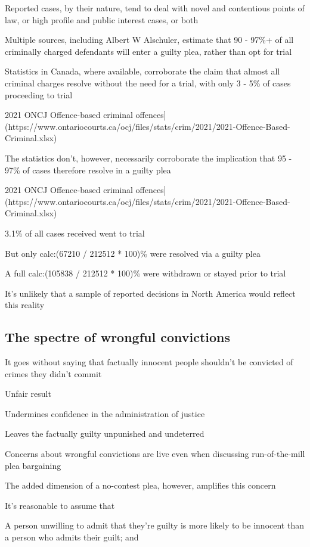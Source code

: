 Reported cases, by their nature, tend to deal with novel and contentious points of law, or high profile and public interest cases, or both

Multiple sources, including Albert W Alschuler, estimate that 90 - 97\%+ of all criminally charged defendants will enter a guilty plea, rather than opt for trial

Statistics in Canada, where available, corroborate the claim that almost all criminal charges resolve without the need for a trial, with only 3 - 5\% of cases proceeding to trial

2021 ONCJ Offence-based criminal offences](https://www.ontariocourts.ca/ocj/files/stats/crim/2021/2021-Offence-Based-Criminal.xlsx)

The statistics don't, however, necessarily corroborate the implication that 95 - 97\% of cases therefore resolve in a guilty plea

2021 ONCJ Offence-based criminal offences](https://www.ontariocourts.ca/ocj/files/stats/crim/2021/2021-Offence-Based-Criminal.xlsx)

3.1\% of all cases received went to trial

But only {{calc:(67210 / 212512 * 100)}}\% were resolved via a guilty plea

A full {{calc:(105838 / 212512 * 100)}}\% were withdrawn or stayed prior to trial

It's unlikely that a sample of reported decisions in North America would reflect this reality

\subsection{The spectre of wrongful convictions}

It goes without saying that factually innocent people shouldn't be convicted of crimes they didn't commit

Unfair result

Undermines confidence in the administration of justice

Leaves the factually guilty unpunished and undeterred

Concerns about wrongful convictions are live even when discussing run-of-the-mill plea bargaining

The added dimension of a no-contest plea, however, amplifies this concern

It's reasonable to assume that

A person unwilling to admit that they're guilty is more likely to be innocent than a person who admits their guilt; and

